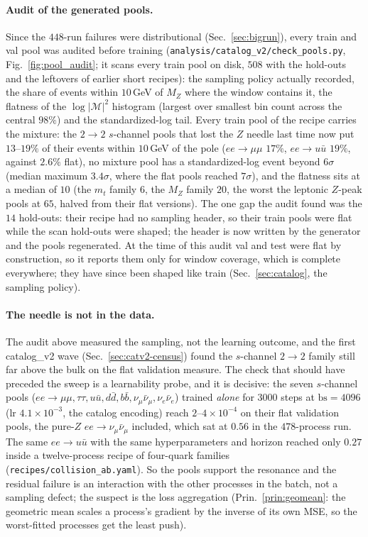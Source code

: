 \documentclass[11pt]{article}
\newcommand{\code}[1]{\texttt{#1}}
\begin{document}
\paragraph{Audit of the generated pools.} Since the $448$-run failures were distributional
(Sec.~\ref{sec:bigrun}), every train and val pool was audited before training
(\code{analysis/catalog\_v2/check\_pools.py}, Fig.~\ref{fig:pool_audit}; it scans every
train pool on disk, $508$ with the hold-outs and the leftovers of earlier short recipes): the sampling
policy actually recorded, the share of events within $10$\,GeV of $M_Z$ where the window
contains it, the flatness of the $\log|\mathcal M|^2$ histogram (largest over smallest bin
count across the central $98\%$) and the standardized-log tail. Every train pool of the recipe
carries the mixture: the $2\to2$ $s$-channel pools that lost the $Z$ needle last time now put
$13$--$19\%$ of their events within $10$\,GeV of the pole ($ee\to\mu\mu$ $17\%$, $ee\to u\bar
u$ $19\%$, against $2.6\%$ flat), no mixture pool has a standardized-log event beyond $6\sigma$
(median maximum $3.4\sigma$, where the flat pools reached $7\sigma$), and the flatness sits
at a median of $10$ (the $m_t$ family $6$, the $M_Z$ family $20$, the worst the leptonic
$Z$-peak pools at $65$, halved from their flat versions). The one gap the audit found was
the $14$ hold-outs: their recipe had no sampling header, so their train pools were flat while
the scan hold-outs were shaped; the header is now written by the generator and the pools
regenerated. At the time of this audit val and test were flat by construction, so it reports
them only for window coverage, which is complete everywhere; they have since been shaped like
train (Sec.~\ref{sec:catalog}, the sampling policy).

\paragraph{The needle is not in the data.} The audit above measured the sampling, not
the learning outcome, and the first catalog\_v2 wave (Sec.~\ref{sec:catv2-census}) found the
$s$-channel $2\to2$ family still far above the bulk on the flat validation measure. The check that
should have preceded the sweep is a learnability probe, and it is decisive: the seven
$s$-channel pools ($ee\to\mu\mu,\tau\tau,u\bar u,d\bar d,b\bar b,\nu_\mu\bar\nu_\mu,
\nu_e\bar\nu_e$) trained \emph{alone} for $3000$ steps at $\mathrm{bs}=4096$ (lr
$4.1\times10^{-3}$, the catalog encoding) reach $2$--$4\times10^{-4}$ on their flat validation
pools, the pure-$Z$ $ee\to\nu_\mu\bar\nu_\mu$ included, which sat at $0.56$ in the
$478$-process run. The same $ee\to u\bar u$ with the same hyperparameters and horizon reached
only $0.27$ inside a twelve-process recipe of four-quark families
(\code{recipes/collision\_ab.yaml}). So the pools support the resonance and the residual
failure is an interaction with the other processes in the batch, not a sampling defect;
the suspect is the loss aggregation (Prin.~\ref{prin:geomean}: the geometric mean scales a
process's gradient by the inverse of its own MSE, so the worst-fitted processes get the
least push).
\end{document}

